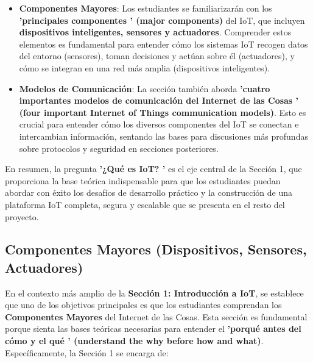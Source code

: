 \documentclass{report}
\begin{document}
\begin{itemize}
    \item \textbf{Componentes Mayores}: Los estudiantes se familiarizarán con los \textbf{ 'principales componentes ' (major components)} del IoT, que 
    incluyen \textbf{dispositivos inteligentes, sensores y actuadores}. Comprender estos elementos es fundamental para entender cómo los sistemas IoT 
    recogen datos del entorno (sensores), toman decisiones y actúan sobre él (actuadores), y cómo se integran en una red más amplia (dispositivos inteligentes).
    \item \textbf{Modelos de Comunicación}: La sección también aborda \textbf{ 'cuatro importantes modelos de comunicación del Internet de las Cosas ' 
    (four important Internet of Things communication models)}. Esto es crucial para entender cómo los diversos componentes del IoT se conectan e intercambian 
    información, sentando las bases para discusiones más profundas sobre protocolos y seguridad en secciones posteriores.
\end{itemize}
En resumen, la pregunta \textbf{ '¿Qué es IoT? '} es el eje central de la Sección 1, que proporciona la base teórica indispensable para que los estudiantes 
puedan abordar con éxito los desafíos de desarrollo práctico y la construcción de una plataforma IoT completa, segura y escalable que se presenta en el 
resto del proyecto.

\subsection{Componentes Mayores (Dispositivos, Sensores, Actuadores)}
En el contexto más amplio de la \textbf{Sección 1: Introducción a IoT}, se  establece que uno de los objetivos principales es que los estudiantes 
comprendan los \textbf{Componentes Mayores} del Internet de las Cosas. Esta sección es fundamental porque sienta las bases teóricas necesarias para entender 
el \textbf{ 'porqué antes del cómo y el qué ' (understand the why before how and what)}. Específicamente, la Sección 1 se encarga de:
\end{document}
